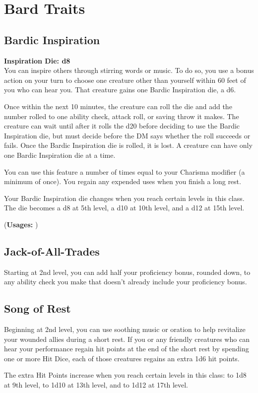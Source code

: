 \documentclass[letterpaper,openany,oneside,twocolumn]{book}
\begin{document}
\section*{Bard Traits}
\subsection*{Bardic Inspiration}
\textbf{Inspiration Die: d8}\\
You can inspire others through stirring words or music. To do so, you use a bonus action on your turn to choose one creature other than yourself within 60 feet of you who can hear you. That creature gains one Bardic Inspiration die, a d6.

Once within the next 10 minutes, the creature can roll the die and add the number rolled to one ability check, attack roll, or saving throw it makes. The creature can wait until after it rolls the d20 before deciding to use the Bardic Inspiration die, but must decide before the DM says whether the roll succeeds or fails. Once the Bardic Inspiration die is rolled, it is lost. A creature can have only one Bardic Inspiration die at a time.

You can use this feature a number of times equal to your Charisma modifier (a minimum of once). You regain any expended uses when you finish a long rest.

Your Bardic Inspiration die changes when you reach certain levels in this class. The die becomes a d8 at 5th level, a d10 at 10th level, and a d12 at 15th level.

(\textbf{Usages: })
\subsection*{Jack-of-All-Trades}
Starting at 2nd level, you can add half your proficiency bonus, rounded down, to any ability check you make that doesn't already include your proficiency bonus.
\subsection*{Song of Rest}
Beginning at 2nd level, you can use soothing music or oration to help revitalize your wounded allies during a short rest. If you or any friendly creatures who can hear your performance regain hit points at the end of the short rest by spending one or more Hit Dice, each of those creatures regains an extra 1d6 hit points.

The extra Hit Points increase when you reach certain levels in this class: to 1d8 at 9th level, to 1d10 at 13th level, and to 1d12 at 17th level.
\end{document}
